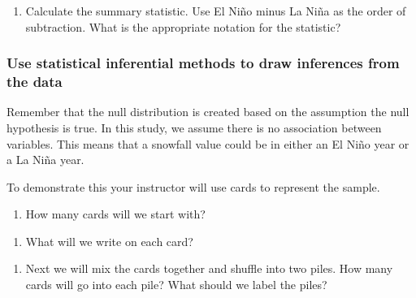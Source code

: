 \documentclass[
]{report}
\providecommand{\tightlist}{%
  \setlength{\itemsep}{0pt}\setlength{\parskip}{0pt}}
\newcommand\latexcode[1]{#1}
\begin{document}
\begin{enumerate}
\def\labelenumi{\arabic{enumi}.}
\setcounter{enumi}{8}
\tightlist
\item
  Calculate the summary statistic. Use El Ni\latexcode{\~{n}}o minus La Ni\latexcode{\~{n}}a as the order of subtraction. What is the appropriate notation for the statistic?
\end{enumerate}

\vspace{0.5in}

\newpage

\hypertarget{use-statistical-inferential-methods-to-draw-inferences-from-the-data-1}{%
\subsubsection*{Use statistical inferential methods to draw inferences from the data}\label{use-statistical-inferential-methods-to-draw-inferences-from-the-data-1}}

Remember that the null distribution is created based on the assumption the null hypothesis is true. In this study, we assume there is no association between variables. This means that a snowfall value could be in either an El Ni\latexcode{\~{n}}o year or a La Ni\latexcode{\~{n}}a year.

To demonstrate this your instructor will use cards to represent the sample.

\begin{enumerate}
\def\labelenumi{\arabic{enumi}.}
\setcounter{enumi}{9}
\tightlist
\item
  How many cards will we start with?
\end{enumerate}

\vspace{0.5in}

\begin{enumerate}
\def\labelenumi{\arabic{enumi}.}
\setcounter{enumi}{10}
\tightlist
\item
  What will we write on each card?
\end{enumerate}

\vspace{0.5in}

\begin{enumerate}
\def\labelenumi{\arabic{enumi}.}
\setcounter{enumi}{11}
\tightlist
\item
  Next we will mix the cards together and shuffle into two piles. How many cards will go into each pile? What should we label the piles?
\end{enumerate}
\end{document}
